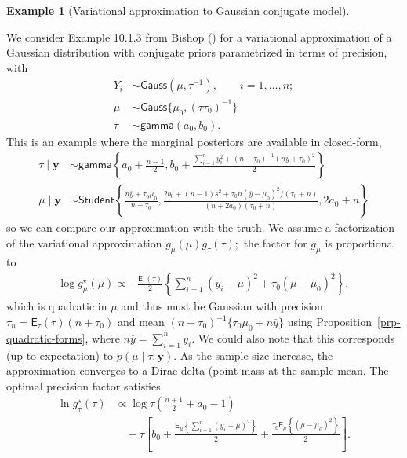 \documentclass[
  11pt,
  letterpaper,
]{scrbook}
\theoremstyle{plain}
\theoremstyle{plain}
\theoremstyle{plain}
\theoremstyle{definition}
\theoremstyle{definition}
\newtheorem{example}{Example}[chapter]
\theoremstyle{definition}
\theoremstyle{remark}
\begin{document}
\begin{example}[Variational approximation to Gaussian conjugate
model]\protect\hypertarget{exm-gaussian-variational-approx}{}\label{exm-gaussian-variational-approx}

We consider Example 10.1.3 from Bishop
() for a variational approximation of a
Gaussian distribution with conjugate priors parametrized in terms of
precision, with \begin{align*}
Y_i &\sim \mathsf{Gauss}(\mu, \tau^{-1}), \qquad i =1, \ldots, n;\\
\mu &\sim \mathsf{Gauss}\{\mu_0, (\tau\tau_0)^{-1}\} \\
\tau &\sim \mathsf{gamma}(a_0, b_0).
\end{align*} This is an example where the marginal posteriors are
available in closed-form, \begin{align*}
\tau \mid \boldsymbol{y} &\sim \mathsf{gamma}\left\{ a_0 + \frac{n-1}{2}, b_0 + \frac{\sum_{i=1}^n y_i^2 + (n+\tau_0)^{-1}(n\overline{y}+\tau_0)^2}{2}\right\} 
\\ \mu \mid \boldsymbol{y} &\sim \mathsf{Student}\left\{ \frac{n\overline{y}+\tau_0\mu_0}{n+\tau_0}, \frac{2b_0 +(n-1)s^2 + \tau_0n(\overline{y}-\mu_0)^2/(\tau_0+n)}{(n+2a_0)(\tau_0+n)}, 2a_0+n\right\}
\end{align*} so we can compare our approximation with the truth. We
assume a factorization of the variational approximation
\(g_\mu(\mu)g_\tau(\tau);\) the factor for \(g_\mu\) is proportional to
\begin{align*}
 \log g^{\star}_{\mu}(\mu) \propto -\frac{\mathsf{E}_{\tau}(\tau)}{2} \left\{ \sum_{i=1}^n (y_i-\mu)^2 + \tau_0(\mu-\mu_0)^2\right\},
\end{align*} which is quadratic in \(\mu\) and thus must be Gaussian
with precision \(\tau_n = \mathsf{E}_{\tau}(\tau)(n + \tau_0)\) and mean
\((n + \tau_0)^{-1}\{\tau_0\mu_0 + n\overline{y}\}\) using
Proposition~\ref{prp-quadratic-forms}, where
\(n\overline{y} = \sum_{i=1}^n y_i.\) We could also note that this
corresponds (up to expectation) to \(p(\mu \mid \tau, \boldsymbol{y}).\)
As the sample size increase, the approximation converges to a Dirac
delta (point mass at the sample mean. The optimal precision factor
satisfies \begin{align*}
 \ln g^{\star}_{\tau}(\tau) &\propto \log \tau\left(\frac{n+1}{2} + a_0-1\right)   \\&\quad- \tau \left[b_0  + \frac{\mathsf{E}_{\mu}\left\{\sum_{i=1}^n (y_i-\mu)^2\right\}}{2}  + \frac{\tau_0\mathsf{E}_{\mu}\left\{(\mu-\mu_0)^2\right\}}{2}\right].

\end{align*}
\end{example}
\end{document}
